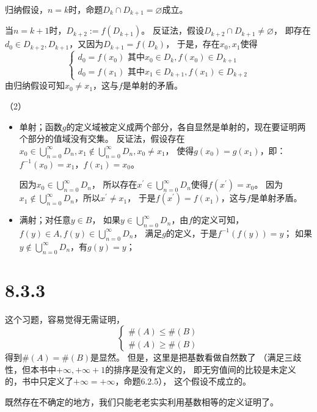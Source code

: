 \documentclass{article}
\begin{document}
归纳假设，$n = k$时，命题$D_{k} \cap D_{k+1} = \varnothing$成立。

当$n = k+1$时，$D_{k+2} := f(D_{k+1})$。
反证法，假设$D_{k+2} \cap D_{k+1} \neq \varnothing$，
即存在$d_0 \in D_{k+2}, D_{k+1}$，又因为$D_{k+1} = f(D_k)$，
于是，存在$x_0, x_1$使得
\begin{equation*}
  \begin{cases*}
    d_0 = f(x_0) \text{ 其中} x_0 \in D_k, f(x_0) \in D_{k+1} \\
    d_0 = f(x_{1}) \text{ 其中}  x_{1} \in D_{k+1}, f(x_1) \in D_{k+2}
  \end{cases*}
\end{equation*}
由归纳假设可知$x_0 \neq x_1$，这与$f$是单射的矛盾。

（2）
\begin{itemize}
  \item 单射；函数$g$的定义域被定义成两个部分，各自显然是单射的，现在要证明两个部分的值域没有交集。
        反证法，假设存在$x_0 \in \bigcup \limits_{n=0}^\infty D_n, x_1 \not \in \bigcup \limits_{n=0}^\infty D_n, x_0 \neq x_1$，
        使得$g(x_0) = g(x_1)$，即：$f^{-1}(x_0) = x_1$，$f(x_1) = x_0$。

        因为$x_0 \in \bigcup \limits_{n=0}^\infty D_n$，
        所以存在$x^\prime \in \bigcup \limits_{n=0}^\infty D_n$使得$f(x^\prime) = x_0$。
        因为$x_1 \not \in \bigcup \limits_{n=0}^\infty D_n$，所以$x^\prime \neq x_1$，
        于是$f(x^\prime) = f(x_1)$，这与$f$是单射矛盾。


  \item 满射；对任意$y \in B$，
        如果$y \in \bigcup \limits_{n=0}^\infty D_n$，由$f$的定义可知，
        $f(y) \in A, f(y) \in \bigcup \limits_{n=0}^\infty D_n$，
        满足$g$的定义，于是$f^{-1}(f(y)) = y$；
        如果$y \not \in \bigcup \limits_{n=0}^\infty D_n$，有$g(y) = y$；
\end{itemize}

\section*{8.3.3}

\begin{zremark}
  这个习题，容易觉得无需证明，
  \begin{equation*}
    \begin{cases*}
      \#(A) \leq \#(B) \\
      \#(A) \geq \#(B)
    \end{cases*}
  \end{equation*}
  得到$\#(A) = \#(B)$是显然。
  但是，这里是把基数看做自然数了
  （满足三歧性，但本书中$+\infty,+\infty + 1$的排序是没有定义的，
  即无穷值间的比较是未定义的，书中只定义了$+\infty = +\infty$，命题6.2.5），
  这个假设不成立的。

  既然存在不确定的地方，我们只能老老实实利用基数相等的定义证明了。
\end{zremark}
\end{document}
